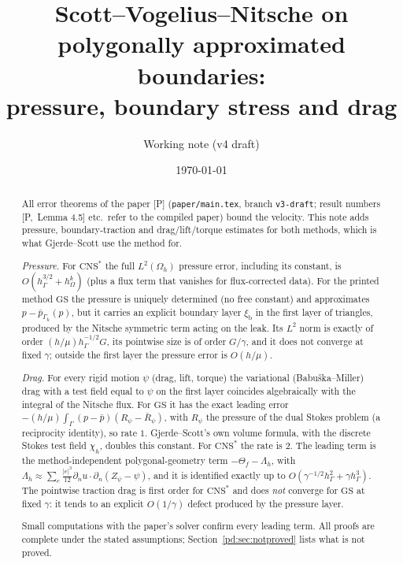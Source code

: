 \documentclass[11pt,reqno]{amsart}
\theoremstyle{plain}
\theoremstyle{definition}
\newcommand{\hG}{h_\Gamma}
\newcommand{\hO}{h_\Omega}
\newcommand{\Gh}{\Gamma_h}
\newcommand{\Oh}{\Omega_h}
\newcommand{\dn}{\partial_n}
\newcommand{\pbar}{\bar p}
\newcommand{\GS}{\mathrm{GS}}
\newcommand{\CNS}{\mathrm{CNS}^\ast}
\newcommand{\Pref}[1]{\textup{[P,~#1]}}
\newcommand{\xib}{\xi_{\mathrm b}}
\begin{document}
\title[SVN on polygonal boundaries: pressure, stress and drag]{Scott--Vogelius--Nitsche on polygonally approximated boundaries:\\ pressure, boundary stress and drag}
\author{Working note (v4 draft)}
\date{\today}

\begin{abstract}
All error theorems of the paper [P] (\texttt{paper/main.tex}, branch \texttt{v3-draft}; result numbers \Pref{Lemma 4.5} etc.\ refer to the compiled paper) bound the velocity. This note adds pressure, boundary-traction and drag/lift/torque estimates for both methods, which is what Gjerde--Scott use the method for.

\emph{Pressure.} For $\CNS$ the full $L^2(\Oh)$ pressure error, including its constant, is $O(\hG^{3/2}+\hO^k)$ (plus a flux term that vanishes for flux-corrected data). For the printed method $\GS$ the pressure is uniquely determined (no free constant) and approximates $p-\pbar_{\Gh}(p)$, but it carries an explicit boundary layer $\xib$ in the first layer of triangles, produced by the Nitsche symmetric term acting on the leak. Its $L^2$ norm is exactly of order $(h/\mu)\hG^{-1/2}G$, its pointwise size is of order $G/\gamma$, and it does not converge at fixed $\gamma$; outside the first layer the pressure error is $O(h/\mu)$.

\emph{Drag.} For every rigid motion $\psi$ (drag, lift, torque) the variational (Babu\v{s}ka--Miller) drag with a test field equal to $\psi$ on the first layer coincides algebraically with the integral of the Nitsche flux. For $\GS$ it has the exact leading error $-(h/\mu)\int_\Gamma(p-\pbar)(R_\psi-\bar R_\psi)$, with $R_\psi$ the pressure of the dual Stokes problem (a reciprocity identity), so rate $1$. Gjerde--Scott's own volume formula, with the discrete Stokes test field $\chi_h$, doubles this constant. For $\CNS$ the rate is $2$. The leading term is the method-independent polygonal-geometry term $-\Theta_f-\Lambda_h$, with $\Lambda_h\approx\sum_e\frac{|e|^3}{12}\dn u\cdot\dn(Z_\psi-\psi)$, and it is identified exactly up to $O(\gamma^{-1/2}\hG^2+\gamma\hG^3)$. The pointwise traction drag is first order for $\CNS$ and does \emph{not} converge for $\GS$ at fixed $\gamma$: it tends to an explicit $O(1/\gamma)$ defect produced by the pressure layer.

Small computations with the paper's solver confirm every leading term. All proofs are complete under the stated assumptions; Section~\ref{pd:sec:notproved} lists what is not proved.
\end{abstract}
\end{document}
